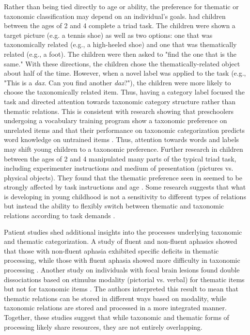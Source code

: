 \documentclass[../dissertation.tex]{subfiles}
\begin{document}
	Rather than being tied directly to age or ability, the preference for thematic or taxonomic classification may depend on an individual's goals. \citet{Markman1984} had children between the ages of 2 and 4 complete a triad task. The children were shown a target picture (e.g. a tennis shoe) as well as two options: one that was taxonomically related (e.g., a high-heeled shoe) and one that was thematically related (e.g., a foot). The children were then asked to "find the one that is the same." With these directions, the children chose the thematically-related object about half of the time. However, when a novel label was applied to the task (e.g., "This is a \textit{dax}. Can you find another \textit{dax}?"), the children were more likely to choose the taxonomically related item. Thus, having a category label focused the task and directed attention towards taxonomic category structure rather than thematic relations. This is consistent with research showing that preschoolers undergoing a vocabulary training program show a taxonomic preference on unrelated items and that their performance on taxonomic categorization predicts word knowledge on untrained items \citep{Kaefer2013}. Thus, attention towards words and labels may shift young children to a taxonomic preference. Further research in children between the ages of 2 and 4 manipulated many parts of the typical triad task, including experimenter instructions and medium of presentation (pictures vs. physical objects). They found that the thematic preference seen in \citet{Smiley1979} seemed to be strongly affected by task instructions and age \citep{Waxman1997}. Some research suggests that what is developing in young childhood is not a sensitivity to different types of relations but instead the ability to flexibly switch between thematic and taxonomic relations according to task demands \citep{Blaye2001}. \par
	Patient studies shed additional insights into the processes underlying taxonomic and thematic categorization. A study of fluent and non-fluent aphasics showed that those with non-fluent aphasia exhibited specific deficits in thematic processing, while those with fluent aphasia showed more difficulty in taxonomic processing \citep{Vivas2016}. Another study on individuals with focal brain lesions found double dissociations based on stimulus modality (pictorial vs. verbal) for thematic items but not for taxonomic items \citep{Vivas2014}. The authors interpreted this result to mean that thematic relations can be stored in different ways based on modality, while taxonomic relations are stored and processed in a more integrated manner. Together, these studies suggest that while taxonomic and thematic forms of processing likely share resources, they are not entirely overlapping. \par
\end{document}
